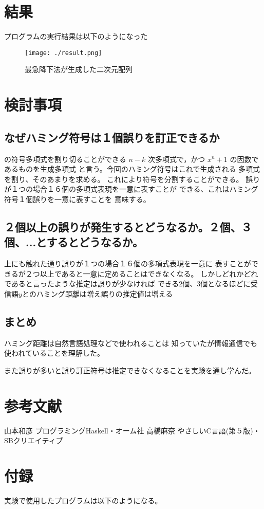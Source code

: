 \documentclass{jsarticle}
\begin{document}
\section{結果}
プログラムの実行結果は以下のようになった
\begin{figure}[H]
  \centering
  \texttt{[image: ./result.png]}
  \caption{最急降下法が生成した二次元配列}
\end{figure}

\section{検討事項}
\subsection{なぜハミング符号は１個誤りを訂正できるか}
の符号多項式を割り切ることができる $n − k$
次多項式で，かつ $x^n + 1$ の因数であるものを生成多項式
と言う。今回のハミング符号はこれで生成される
多項式を割り、そのあまりを求める。
これにより符号を分割することができる。 
誤りが１つの場合１６個の多項式表現を一意に表すことが
できる、これはハミング符号１個誤りを一意に表すことを
意味する。

\subsection{２個以上の誤りが発生するとどうなるか。２個、３個、...とするとどうなるか。}
上にも触れた通り誤りが１つの場合１６個の多項式表現を一意に
表すことができるが２つ以上であると一意に定めることはできなくなる。
しかしどれかどれであると言ったような推定は誤りが少なければ
できる2個、3個となるほどに受信語$y$とのハミング距離は増え誤りの推定値は増える

\subsection{まとめ}
ハミング距離は自然言語処理などで使われることは
知っていたが情報通信でも使われていることを理解した。

また誤りが多いと誤り訂正符号は推定できなくなることを実験を通し学んだ。

\section{参考文献}
\begin{thebibliography}{9}
   山本和彦 プログラミングHaskell・オーム社
   高橋麻奈 やさしいC言語(第５版)・SBクリエイティブ
\end{thebibliography}

\section{付録}
実験で使用したプログラムは以下のようになる。

\end{document}
